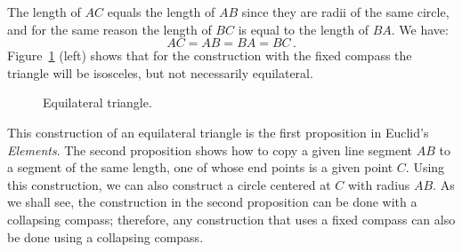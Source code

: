 The length of $AC$ equals the length of $AB$ since they are radii of the same circle, and for the same reason the length of $BC$ is equal to the length of $BA$. We have:
\[
AC=AB=BA=BC\,.
\]
Figure~\ref{fig.equilateral} (left) shows that for the construction with the fixed compass the triangle will be isosceles, but not necessarily equilateral.
\begin{figure}[H]
\begin{center}
\caption{Equilateral triangle.}\label{fig.equilateral}
\end{center}
\end{figure}
\vspace*{-4ex}
This construction of an equilateral triangle is the first proposition in Euclid's \emph{Elements}. The second proposition shows how to copy a given line segment $AB$ to a segment of the same length, one of whose end points is a given point $C$. Using this construction, we can also construct a circle centered at $C$ with radius $AB$. As we shall see, the construction in the second proposition can be done with a collapsing compass; therefore, any construction that uses a fixed compass can also be done using a collapsing compass.

